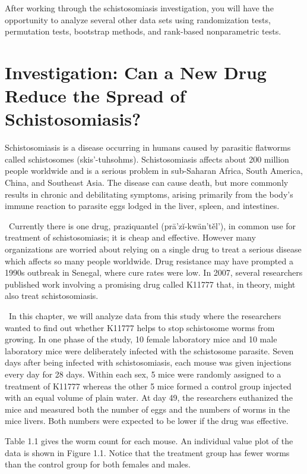 \documentclass[
]{report}
\begin{document}
After working through the schistosomiasis investigation, you will have the opportunity to
analyze several other data sets using randomization tests, permutation tests, bootstrap methods,
and rank-based nonparametric tests.

\section{\texorpdfstring{\textbf{Investigation: Can a New Drug Reduce the Spread of Schistosomiasis?}}{Investigation: Can a New Drug Reduce the Spread of Schistosomiasis?}}\label{investigation-can-a-new-drug-reduce-the-spread-of-schistosomiasis}

Schistosomiasis is a disease occurring in humans caused by parasitic flatworms called schistosomes (skis'-tuhsohms).
Schistosomiasis affects about 200 million people worldwide and is a serious problem in sub-Saharan
Africa, South America, China, and Southeast Asia. The disease can cause death, but more commonly results
in chronic and debilitating symptoms, arising primarily from the body's immune reaction to parasite eggs
lodged in the liver, spleen, and intestines.

~Currently there is one drug, praziquantel (prā'zĭ-kwän'těl'), in common use for treatment of schistosomiasis; it is cheap and effective. However many organizations are worried about relying on a single drug to treat a serious disease which affects so many people worldwide. Drug resistance may have prompted a 1990s outbreak in Senegal, where cure rates were low. In 2007, several researchers published work involving a promising drug called K11777 that, in theory, might also treat schistosomiasis.

~In this chapter, we will analyze data from this study where the researchers wanted to find out whether K11777 helps to stop schistosome worms from growing. In one phase of the study, 10 female laboratory mice and 10 male laboratory mice were deliberately infected with the schistosome parasite. Seven days after being infected with schistosomiasis, each mouse was given injections every day for 28 days. Within each sex, 5 mice were randomly assigned to a treatment of K11777 whereas the other 5 mice formed a control group injected with an equal volume of plain water. At day 49, the researchers euthanized the mice and measured both the number of eggs and the numbers of worms in the mice livers. Both numbers were expected to be lower if the drug was effective.

Table 1.1 gives the worm count for each mouse. An individual value plot of the data is shown in Figure 1.1. Notice that the treatment group has fewer worms than the control group for both females and males.
\end{document}
